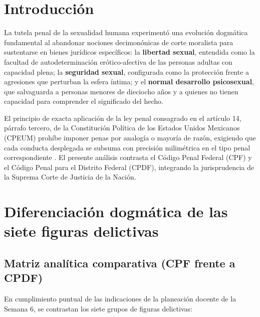 \documentclass[spanish,letterpaper,oneside]{article}
\begin{document}
\section{Introducción}
\hypertarget{cuerpo-inicio}{}
La tutela penal de la sexualidad humana experimentó una evolución dogmática fundamental al abandonar nociones decimonónicas de corte moralista para sustentarse en bienes jurídicos específicos: la \textbf{libertad sexual}, entendida como la facultad de autodeterminación erótico-afectiva de las personas adultas con capacidad plena; la \textbf{seguridad sexual}, configurada como la protección frente a agresiones que perturban la esfera íntima; y el \textbf{normal desarrollo psicosexual}, que salvaguarda a personas menores de dieciocho años y a quienes no tienen capacidad para comprender el significado del hecho.

El principio de exacta aplicación de la ley penal consagrado en el artículo 14, párrafo tercero, de la Constitución Política de los Estados Unidos Mexicanos (CPEUM) prohíbe imponer penas por analogía o mayoría de razón, exigiendo que cada conducta desplegada se subsuma con precisión milimétrica en el tipo penal correspondiente \citep{cpeumS4Vigente}. El presente análisis contrasta el Código Penal Federal (CPF) y el Código Penal para el Distrito Federal (CPDF), integrando la jurisprudencia de la Suprema Corte de Justicia de la Nación.

\section{Diferenciación dogmática de las siete figuras delictivas}

\subsection*{Matriz analítica comparativa (CPF frente a CPDF)}
En cumplimiento puntual de las indicaciones de la planeación docente de la Semana 6, se contrastan los siete grupos de figuras delictivas:
\end{document}

